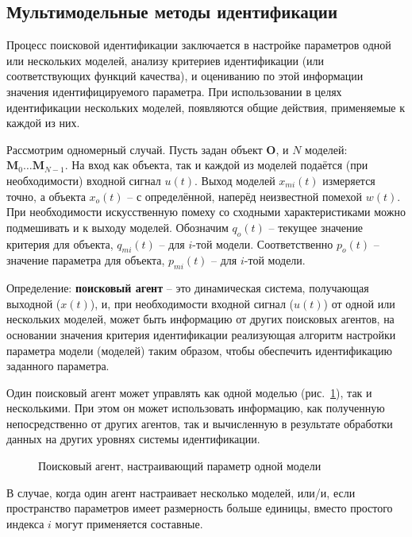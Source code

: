 \documentclass[a4paper,paratype,12pt,fouriernc]{cmonogra}
\begin{document}
\subsection*{Мультимодельные методы идентификации}

Процесс поисковой идентификации заключается в настройке параметров одной
или нескольких моделей, анализу критериев идентификации
(или соответствующих функций качества), и оцениванию по этой информации
значения идентифицируемого параметра. При использовании в целях идентификации нескольких моделей,
появляются общие действия, применяемые к каждой из них.

Рассмотрим одномерный случай.
Пусть задан объект $ \mathbf{O} $, и $N$ моделей:
$ \mathbf{M}_0 \ldots \mathbf{M}_{N-1} $.
На вход как объекта, так и каждой из моделей подаётся (при необходимости)
входной сигнал $u(t)$. Выход моделей $x_{mi}(t)$ измеряется точно,
а объекта $x_o(t)$ -- с определённой, наперёд неизвестной помехой $w(t)$. При необходимости искусственную помеху
со сходными характеристиками можно подмешивать и к выходу моделей.
Обозначим $q_o(t)$ -- текущее значение критерия для
объекта, $q_{mi}(t)$ -- для $i$-той модели.
Соответственно $p_o(t)$ -- значение параметра для объекта,
$p_{mi}(t)$ -- для $i$-той модели.


Определение: \textbf{поисковый агент} -- это динамическая система, получающая выходной ($x(t)$),
и, при необходимости входной сигнал ($u(t)$) от одной или нескольких моделей,
может быть информацию от других поисковых агентов,
на основании значения критерия идентификации
реализующая алгоритм настройки параметра модели (моделей)
таким образом, чтобы обеспечить идентификацию заданного параметра.

Один поисковый агент может управлять как одной моделью (рис.~\ref{atu:f:agent1}),
так и несколькими.
При этом он может использовать информацию,
как полученную непосредственно от других агентов,
так и вычисленную в результате обработки данных на других уровнях системы идентификации.

\begin{figure}[htb!]
\begin{center}

\end{center}
\caption{Поисковый агент, настраивающий параметр одной модели}
\label{atu:f:agent1}
\end{figure}


В случае, когда один агент настраивает несколько моделей,
или/и, если пространство параметров имеет размерность больше единицы,
вместо простого индекса $i$ могут применяется составные.
\end{document}
